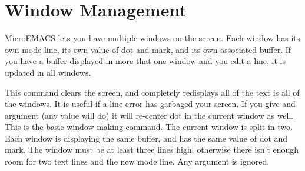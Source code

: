 \section{Window Management}
MicroEMACS lets you have multiple windows on the screen.
Each window has its own mode line, its own value of dot and mark,
and its own associated buffer. If you have a buffer displayed in more
that one window and you edit a line, it is updated in all windows.
\begin{cmdlist}
This command clears the screen, and completely redisplays all
of the text is all of the windows. It is useful if a line error has garbaged
your screen. If you give  and argument
(any value will do) it will re-center
dot in the current window as well.
This is the basic window making command. The current window
is split in two. Each window is displaying the same buffer, and has
the same value of dot and mark. The window must be at least three lines
high, otherwise there isn't enough room for two text lines and the
new mode line. Any argument is ignored.


\end{cmdlist}
